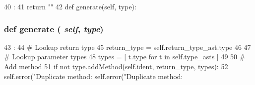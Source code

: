\begin{DoxyCode}
40                       :
41         return ""
42 
    def generate(self, type):
\end{DoxyCode}
\hypertarget{classslicc_1_1ast_1_1TypeFieldMethodAST_1_1TypeFieldMethodAST_a4555d1cee0dccf3942ea35fe86de2e8e}{
\subsubsection[{generate}]{\setlength{\rightskip}{0pt plus 5cm}def generate ( {\em self}, \/   {\em type})}}
\label{classslicc_1_1ast_1_1TypeFieldMethodAST_1_1TypeFieldMethodAST_a4555d1cee0dccf3942ea35fe86de2e8e}



\begin{DoxyCode}
43                             :
44         # Lookup return type
45         return_type = self.return_type_ast.type
46 
47         # Lookup parameter types
48         types = [ t.type for t in self.type_asts ]
49 
50         # Add method
51         if not type.addMethod(self.ident, return_type, types):
52             self.error("Duplicate method: %
            self.error("Duplicate method: %
\end{DoxyCode}


